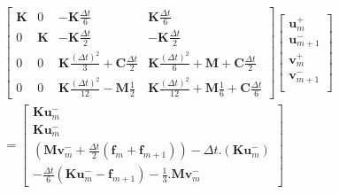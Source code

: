 \documentclass[12pt,a4paper]{report}
\begin{document}
\begin{equation}
\begin{array}{c}
		\begin{bmatrix}   
		   		\mathbf{K}
			&
		   		0
		   	&
			   	-\mathbf{K} \frac{\Delta t}{6} 
		   	&
		   		\mathbf{K} \frac{\Delta t}{6} 
		\\ 	     
			   0 
			&
				\mathbf{K} 
		   	&
		   		-\mathbf{K} \frac{\Delta t}{2} 
		   	&
		   		-\mathbf{K} \frac{\Delta t}{2}
		\\   
		   		0
		   	& 
		   		0
		   	&
			   	\mathbf{K}
			   		\frac{(\Delta t)^2}{3} 
		   		+\mathbf{C} \frac{\Delta t}{2}
		   	&
		   		\mathbf{K} \frac{(\Delta t)^2}{6} 
		   		+\mathbf{M} 
			   	+\mathbf{C} \frac{\Delta t}{2}
		\\    
		   		0
		   	&
		   		0
		   	&
		   		\mathbf{K} \frac{(\Delta t)^2}{12}
		   		-\mathbf{M}
			   		\frac{1}{2} 
		   	&
		   		\mathbf{K} \frac{(\Delta t)^2}{12}
		   		+\mathbf{M} \frac{1}{6} 
			   +\mathbf{C} \frac{\Delta t}{6} 
	\end{bmatrix}
	\begin{bmatrix}
		   \mathbf{u}_m^+  		\\
		   \mathbf{u}_{m+1}^-  	\\
		   \mathbf{v}_m^+  		\\
		   \mathbf{v}_{m+1}^-  	\\
	\end{bmatrix}
	\\ =
	\begin{bmatrix}	
		  \mathbf{K} \mathbf{u}_m^-
		\\ \mathbf{K} \mathbf{u}_m^-
		\\ 	\left( \mathbf{M} \mathbf{v}_m^-
		     			+\frac{\Delta t}{2}  (\mathbf{f}_m + \mathbf{f}_{m+1})
			  \right)
			-\Delta t.
			 \left( \mathbf{K} \mathbf{u}_m^-
			  \right)
		\\-\frac{\Delta t}{6}
				\left( \mathbf{K} \mathbf{u}_m^- 
						-\mathbf{f}_{m+1}
				\right)
					  
			- \frac{1}{3} .  \mathbf{M} \mathbf{v}_m^-
	\end{bmatrix}
\end{array}
\end{equation}



 
 
\end{document}
